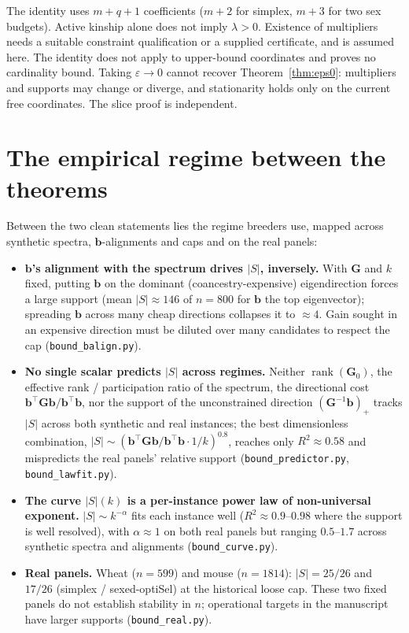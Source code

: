 \documentclass[11pt]{article}
\theoremstyle{plain}
\newcommand{\tp}{^{\top}}
\newcommand{\bb}{\mathbf{b}}
\newcommand{\bG}{\mathbf{G}}
\begin{document}
The identity uses $m+q+1$ coefficients ($m+2$ for simplex, $m+3$ for two sex budgets). Active kinship alone does not imply $\lambda>0$. Existence of multipliers needs a suitable constraint qualification or a supplied certificate, and is assumed here. The identity does not apply to upper-bound coordinates and proves no cardinality bound. Taking $\varepsilon\to0$ cannot recover Theorem~\ref{thm:eps0}: multipliers and supports may change or diverge, and stationarity holds only on the current free coordinates. The slice proof is independent.

\section{The empirical regime between the theorems}\label{sec:empirical}

Between the two clean statements lies the regime breeders use, mapped across synthetic spectra,
$\bb$-alignments and caps and on the real panels:

\begin{itemize}
\item \textbf{$\bb$'s alignment with the spectrum drives $|S|$, inversely.} With $\bG$ and $k$
  fixed, putting $\bb$ on the dominant (coancestry-expensive) eigendirection forces a large
  support (mean $|S| \approx 146$ of $n = 800$ for $\bb$ the top eigenvector); spreading $\bb$
  across many cheap directions collapses it to $\approx 4$. Gain sought in an expensive
  direction must be diluted over many candidates to respect the cap (\texttt{bound\_balign.py}).
\item \textbf{No single scalar predicts $|S|$ across regimes.} Neither $\operatorname{rank}(\bG_0)$,
  the effective rank / participation ratio of the spectrum, the directional cost
  $\bb\tp\bG\bb/\bb\tp\bb$, nor the support of the unconstrained direction $(\bG^{-1}\bb)_+$
  tracks $|S|$ across both synthetic and real instances; the best dimensionless combination,
  $|S| \sim (\bb\tp\bG\bb/\bb\tp\bb \cdot 1/k)^{0.8}$, reaches only $R^2 \approx 0.58$ and
  mispredicts the real panels' relative support (\texttt{bound\_predictor.py},
  \texttt{bound\_lawfit.py}).
\item \textbf{The curve $|S|(k)$ is a per-instance power law of non-universal exponent.}
  $|S| \sim k^{-\alpha}$ fits each instance well ($R^2 \approx 0.9$--$0.98$ where the support is
  well resolved), with $\alpha \approx 1$ on both real panels but ranging $0.5$--$1.7$ across
  synthetic spectra and alignments (\texttt{bound\_curve.py}).
\item \textbf{Real panels.} Wheat ($n = 599$) and mouse ($n = 1814$): $|S| = 25/26$ and $17/26$
  (simplex / sexed-optiSel) at the historical loose cap. These two fixed panels do not establish stability in $n$; operational targets in the manuscript have larger supports
  (\texttt{bound\_real.py}).
\end{itemize}
\end{document}
